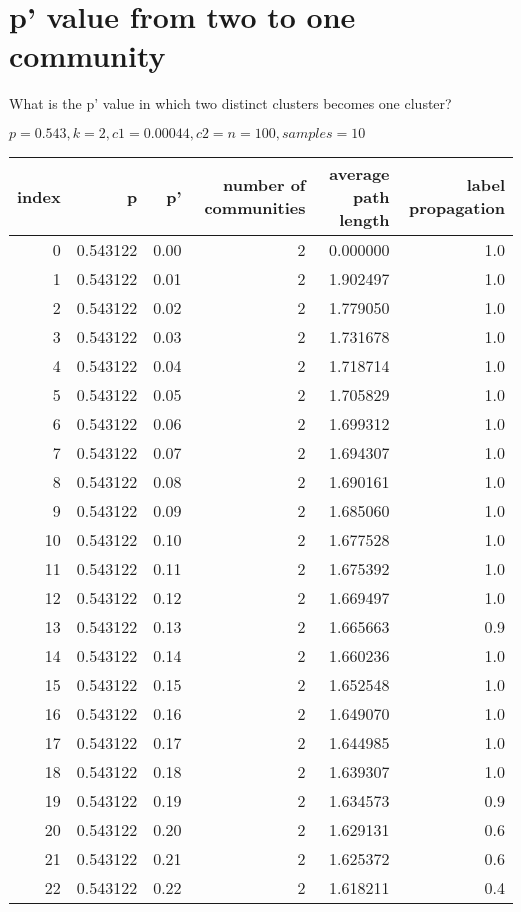 \documentclass[11pt]{article}
\begin{document}
\section{p' value from two to one community}
\label{sec:orgb1a91a6}

What is the p' value in which two distinct clusters becomes one cluster?

\(p = 0.543, k = 2, c1 = 0.00044, c2 = n = 100, samples = 10\)

\begin{center}
\begin{tabular}{rrrrrr}
\hline
index & p & p' & number of communities & average path length & label propagation\\
\hline
0 & 0.543122 & 0.00 & 2 & 0.000000 & 1.0\\
1 & 0.543122 & 0.01 & 2 & 1.902497 & 1.0\\
\hline
2 & 0.543122 & 0.02 & 2 & 1.779050 & 1.0\\
3 & 0.543122 & 0.03 & 2 & 1.731678 & 1.0\\
4 & 0.543122 & 0.04 & 2 & 1.718714 & 1.0\\
5 & 0.543122 & 0.05 & 2 & 1.705829 & 1.0\\
6 & 0.543122 & 0.06 & 2 & 1.699312 & 1.0\\
7 & 0.543122 & 0.07 & 2 & 1.694307 & 1.0\\
8 & 0.543122 & 0.08 & 2 & 1.690161 & 1.0\\
9 & 0.543122 & 0.09 & 2 & 1.685060 & 1.0\\
10 & 0.543122 & 0.10 & 2 & 1.677528 & 1.0\\
11 & 0.543122 & 0.11 & 2 & 1.675392 & 1.0\\
12 & 0.543122 & 0.12 & 2 & 1.669497 & 1.0\\
13 & 0.543122 & 0.13 & 2 & 1.665663 & 0.9\\
14 & 0.543122 & 0.14 & 2 & 1.660236 & 1.0\\
15 & 0.543122 & 0.15 & 2 & 1.652548 & 1.0\\
16 & 0.543122 & 0.16 & 2 & 1.649070 & 1.0\\
17 & 0.543122 & 0.17 & 2 & 1.644985 & 1.0\\
18 & 0.543122 & 0.18 & 2 & 1.639307 & 1.0\\
19 & 0.543122 & 0.19 & 2 & 1.634573 & 0.9\\
20 & 0.543122 & 0.20 & 2 & 1.629131 & 0.6\\
21 & 0.543122 & 0.21 & 2 & 1.625372 & 0.6\\
22 & 0.543122 & 0.22 & 2 & 1.618211 & 0.4\\

\end{tabular}
\end{center}
\end{document}
